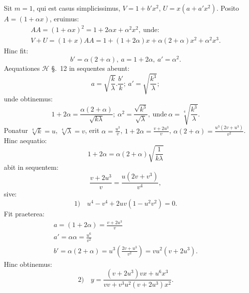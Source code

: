\documentclass{article}
\begin{document}
Sit $m=1$, qui est casus simplicissimus, $V=1+b'x^{2}$, $U=x(a+a'x^{2})$. Posito $A=(1+\alpha x)$, eruimus:
\[
\begin{gathered}
AA=(1+\alpha x)^{2}=1+2\alpha x+\alpha^{2}x^{2},\ \text{unde:}\\
V+U=(1+x)AA=1+(1+2\alpha)x+\alpha(2+\alpha)x^{2}+\alpha^{2}x^{3}.
\end{gathered}
\]
Hinc fit:
\[
b'=\alpha(2+\alpha),\ a=1+2\alpha,\ a'=\alpha^{2}.
\]
Aequationes $\mathcal{H}$ §.\ 12 in sequentes abeunt:
\[
a=\sqrt{\frac{k}{\lambda}}.\frac{b'}{k};\ a'=\sqrt{\frac{k^{3}}{\lambda}};
\]
unde obtinemus:
\[
1+2\alpha=\frac{\alpha(2+\alpha)}{\sqrt{k\lambda}};\ \alpha^{2}=\frac{\sqrt{k^{3}}}{\sqrt{\lambda}},\ \text{unde}\ \alpha=\sqrt[4]{\frac{k^{3}}{\lambda}}.
\]
Ponatur $\sqrt[4]{k}=u$, $\sqrt[4]{\lambda}=v$, erit $\alpha=\frac{u^{3}}{v}$, $1+2\alpha=\frac{v+2u^{3}}{v}$, $\alpha(2+\alpha)=\frac{u^{3}(2v+u^{3})}{v^{2}}$. Hinc aequatio:
\[
1+2\alpha=\alpha(2+\alpha)\sqrt{\frac{1}{k\lambda}}
\]
abit in sequentem:
\[
\frac{v+2u^{3}}{v}=\frac{u(2v+v^{3})}{v^{4}},
\]
sive:
\[
\text{1)}\quad u^{4}-v^{4}+2uv(1-u^{2}v^{2})=0.
\]
Fit praeterea:
\[
\begin{gathered}
a=(1+2\alpha)=\frac{v+2u^{3}}{v}\\
a'=\alpha\alpha=\frac{u^{6}}{v^{2}}\\
b'=\alpha(2+\alpha)=u^{3}\left(\frac{2v+u^{3}}{v^{2}}\right)=vu^{2}(v+2u^{3}).
\end{gathered}
\]
Hinc obtinemus:
\[
\text{2)}\quad y=\frac{(v+2u^{3})vx+u^{6}x^{3}}{vv+v^{3}u^{2}(v+2u^{3})x^{2}}.
\]

\end{document}
